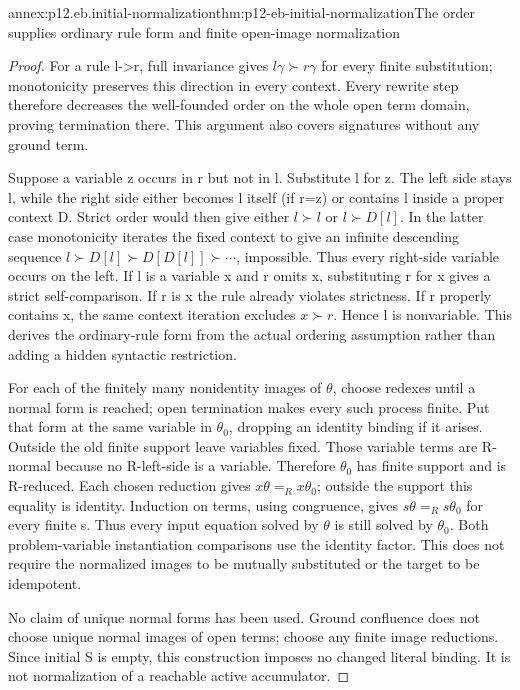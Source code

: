 \begin{annexitem}{annex:p12.eb.initial-normalization}{thm:p12-eb-initial-normalization}{The order supplies ordinary rule form and finite open-image normalization}
\begin{proof}
For a rule l->r, full invariance gives
\(l\gamma\succ r\gamma\) for every finite substitution;
monotonicity preserves this direction in every context. Every
rewrite step therefore decreases the well-founded order on the
whole open term domain, proving termination there. This argument
also covers signatures without any ground term.

Suppose a variable z occurs in r but not in l. Substitute l for z.
The left side stays l, while the right side either becomes l
itself (if r=z) or contains l inside a proper context D.
Strict order would then give either \(l\succ l\) or
\(l\succ D[l]\). In the latter case monotonicity iterates
the fixed context to give an infinite descending sequence
\(l\succ D[l]\succ D[D[l]]\succ\cdots\), impossible.
Thus every right-side variable occurs on the left.
If l is a variable x and r omits x, substituting r for x
gives a strict self-comparison. If r is x the rule already
violates strictness. If r properly contains x, the same context
iteration excludes \(x\succ r\). Hence l is nonvariable.
This derives the ordinary-rule form from the actual ordering
assumption rather than adding a hidden syntactic restriction.

For each of the finitely many nonidentity images of \(\theta\),
choose redexes until a normal form is reached; open termination
makes every such process finite. Put that form at the same
variable in \(\theta_0\), dropping an identity binding if it
arises. Outside the old finite support leave variables fixed.
Those variable terms are R-normal because no R-left-side is a
variable. Therefore \(\theta_0\) has finite support and is
R-reduced. Each chosen reduction gives
\(x\theta=_Rx\theta_0\); outside the support this equality
is identity. Induction on terms, using congruence, gives
\(s\theta=_Rs\theta_0\) for every finite s. Thus every
input equation solved by \(\theta\) is still solved by
\(\theta_0\). Both problem-variable instantiation comparisons
use the identity factor. This does not require the normalized
images to be mutually substituted or the target to be idempotent.

No claim of unique normal forms has been used. Ground confluence
does not choose unique normal images of open terms; choose any
finite image reductions. Since initial S is empty, this construction
imposes no changed literal binding. It is not normalization of a
reachable active accumulator.
\end{proof}
\end{annexitem}


